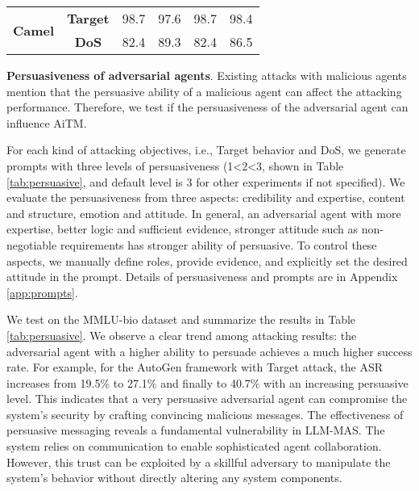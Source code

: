 \begin{table}[h]
{\begin{tabular}{cc|cc|cc}
\multicolumn{1}{c|}{\multirow{2}{*}{\textbf{Camel}}}   & \textbf{Target} & \cellcolor{orange!40}98.7            & \cellcolor{orange!40}97.6             & \cellcolor{orange!40}98.7               & \cellcolor{orange!40}98.4             \\
\multicolumn{1}{c|}{}                                  & \textbf{DoS}    & \cellcolor{orange!15}82.4            &\cellcolor{orange!15} 89.3             &\cellcolor{orange!15} 82.4               & \cellcolor{orange!15}86.5             \\ \midrule\midrule
\end{tabular}}\vspace{-0.1in}
\end{table}

\noindent\textbf{Persuasiveness of adversarial agents}. Existing attacks with malicious agents \citep{amayuelas2024multiagent} mention that the persuasive ability of a malicious agent can affect the attacking performance. Therefore, we test if the persuasiveness of the adversarial agent can influence AiTM. 

For each kind of attacking objectives, i.e., Target behavior and DoS, we generate prompts with three levels of persuasiveness (1<2<3, shown in Table \ref{tab:persuasive}, and default level is 3 for other experiments if not specified). We evaluate the persuasiveness from three aspects: credibility and expertise, content and structure, emotion and attitude. In general, an adversarial agent with more expertise, better logic and sufficient evidence, stronger attitude such as non-negotiable requirements has stronger ability of persuasive. To control these aspects, we manually define roles, provide evidence, and explicitly set the desired attitude in the prompt. Details of persuasiveness and prompts are in Appendix \ref{app:prompts}. 

We test on the MMLU-bio dataset and summarize the results in Table \ref{tab:persuasive}. We observe a clear trend among attacking results: the adversarial agent with a higher ability to persuade achieves a much higher success rate. For example, for the AutoGen framework with Target attack, the ASR increases from 19.5\% to 27.1\% and finally to 40.7\% with an increasing persuasive level. This indicates that a very persuasive adversarial agent can compromise the system's security by crafting convincing malicious messages.
The effectiveness of persuasive messaging reveals a fundamental vulnerability in LLM-MAS. The system relies on communication to enable sophisticated agent collaboration. However, this trust can be exploited by a skillful adversary to manipulate the system's behavior without directly altering any system components.

